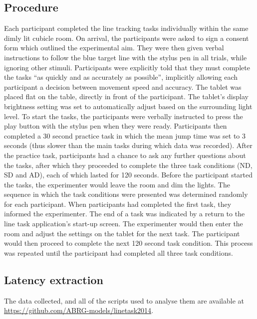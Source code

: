 \documentclass[10pt,letterpaper]{article}
\begin{document}
\subsection*{Procedure}
Each participant completed the line tracking tasks individually within
the same dimly lit cubicle room.
On arrival, the participants were asked to sign a consent form which
outlined the experimental aim. They were then given verbal
instructions to follow the blue target line with the stylus pen in all
trials, while ignoring other stimuli. Participants were explicitly
told that they must complete the tasks ``as quickly and as accurately
as possible'', implicitly allowing each participant a decision
between movement speed and accuracy.
%
The tablet was placed
flat on the table, directly in front of the participant. The tablet's
display brightness setting was set to automatically adjust based on
the surrounding light level. To start the tasks, the participants were
verbally instructed to press the play button with the stylus pen when
they were ready. Participants then completed a 30 second practice
%
task in which the mean jump time was set to 3 seconds (thus slower
than the main tasks during which data was recorded). After the
practice task, participants had a chance to ask any further questions
about the tasks, after which they proceeded to complete the three task
conditions (ND, SD and AD), each of which lasted for 120
seconds. Before the participant started the tasks, the experimenter
would leave the room and dim the lights.
%
The sequence in which the task conditions were presented was
determined randomly for each participant. When participants had
completed the first task, they informed the experimenter. The end of a
task was indicated by a return to the line task application's start-up
screen. The experimenter would then enter the room and adjust the
settings on the tablet for the next task. The participant would then
proceed to complete the next 120 second task condition. This process
was repeated until the participant had completed all three task
conditions.

\subsection*{Latency extraction}
The data collected, and all of the scripts used to analyse them are
available at \url{https://github.com/ABRG-models/linetask2014}.
\end{document}
